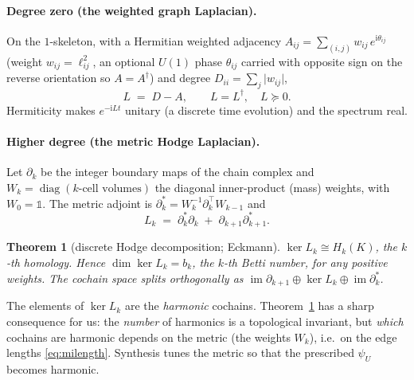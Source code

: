 \documentclass[11pt]{article}
\DeclareMathOperator{\diag}{diag}
\DeclareMathOperator{\im}{im}
\newcommand{\abs}[1]{\lvert #1 \rvert}
\newcommand{\bd}{\partial}
\theoremstyle{definition}
\theoremstyle{plain}
\newtheorem{theorem}[definition]{Theorem}
\begin{document}
\paragraph{Degree zero (the weighted graph Laplacian).}
On the $1$-skeleton, with a Hermitian weighted adjacency
$A_{ij}=\sum_{(i,j)} w_{ij}\,e^{\mathrm{i}\theta_{ij}}$ (weight $w_{ij}=\ell_{ij}^2$, an
optional $U(1)$ phase $\theta_{ij}$ carried with opposite sign on the reverse orientation so
$A=A^\dagger$) and degree $D_{ii}=\sum_j \abs{w_{ij}}$,
\begin{equation}
L \;=\; D - A, \qquad L=L^\dagger,\quad L\succeq 0 .
\end{equation}
Hermiticity makes $e^{-\mathrm{i}Lt}$ unitary (a discrete time evolution) and the spectrum
real.

\paragraph{Higher degree (the metric Hodge Laplacian).}
Let $\bd_k$ be the integer boundary maps of the chain complex and $W_k=\diag(\text{$k$-cell
volumes})$ the diagonal inner-product (mass) weights, with $W_0=\mathbb{1}$. The metric
adjoint is $\bd_k^{*}=W_k^{-1}\bd_k^{\top}W_{k-1}$ and
\begin{equation}
L_k \;=\; \bd_k^{*}\bd_k \;+\; \bd_{k+1}\bd_{k+1}^{*}.
\label{eq:hodgek}
\end{equation}

\begin{theorem}[discrete Hodge decomposition; Eckmann]
\label{thm:hodge}
$\ker L_k \cong H_k(K)$, the $k$-th homology. Hence $\dim\ker L_k = b_k$, the $k$-th Betti
number, for \emph{any} positive weights. The cochain space splits orthogonally as
$\im\bd_{k+1}\oplus\ker L_k\oplus\im\bd_k^{*}$.
\end{theorem}

The elements of $\ker L_k$ are the \emph{harmonic} cochains. Theorem~\ref{thm:hodge} has a
sharp consequence for us: the \emph{number} of harmonics is a topological invariant, but
\emph{which} cochains are harmonic depends on the metric (the weights $W_k$), i.e.\ on the
edge lengths \eqref{eq:milength}. Synthesis tunes the metric so that the prescribed
$\psi_U$ becomes harmonic.
\end{document}
